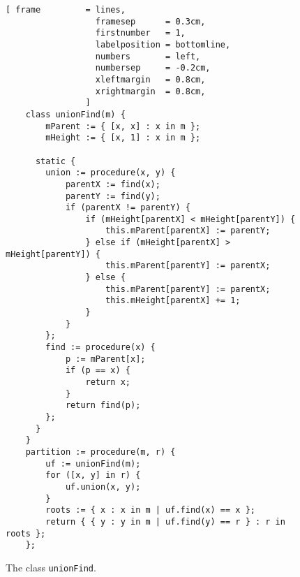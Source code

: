 \begin{figure}[!ht]
\centering
\begin{Verbatim}[ frame         = lines, 
                  framesep      = 0.3cm, 
                  firstnumber   = 1,
                  labelposition = bottomline,
                  numbers       = left,
                  numbersep     = -0.2cm,
                  xleftmargin   = 0.8cm,
                  xrightmargin  = 0.8cm,
                ]
    class unionFind(m) {
        mParent := { [x, x] : x in m };
        mHeight := { [x, 1] : x in m };
        
      static {
        union := procedure(x, y) {
            parentX := find(x);
            parentY := find(y);
            if (parentX != parentY) {
                if (mHeight[parentX] < mHeight[parentY]) {
                    this.mParent[parentX] := parentY;  
                } else if (mHeight[parentX] > mHeight[parentY]) {
                    this.mParent[parentY] := parentX;  
                } else {
                    this.mParent[parentY] := parentX;  
                    this.mHeight[parentX] += 1;
                }
            }
        };
        find := procedure(x) {
            p := mParent[x]; 
            if (p == x) {
                return x;
            }
            return find(p);
        };
      }
    }
    partition := procedure(m, r) {
        uf := unionFind(m);
        for ([x, y] in r) {
            uf.union(x, y);
        }
        roots := { x : x in m | uf.find(x) == x };
        return { { y : y in m | uf.find(y) == r } : r in roots };
    };
\end{Verbatim}
\vspace*{-0.3cm}
\caption{The class \texttt{unionFind}.}
\label{fig:union-find-oo.stlx}
\end{figure}

